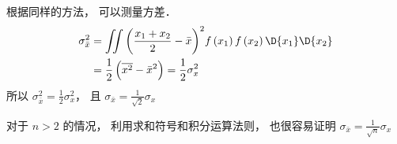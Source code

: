 根据同样的方法， 可以测量方差．
  \begin{equation}
  \begin{aligned}
\sigma_{\bar x}^2 &= \iint {{{\left( {\frac{{x_1} + {x_2}}{2} - \bar x} \right)}^2}f\left( {x_1} \right)f\left( {x_2} \right)\D {x_1}\D {x_2}} \\
&= \frac{1}{2}\left( {\overline {x^2}  - {{\bar x}^2}} \right) = \frac{1}{2}\sigma_x^2
\end{aligned} 
\end{equation}
所以 $\sigma_{\bar x}^2 = \frac{1}{2}\sigma_x^2$，  且  ${\sigma_{\bar x}} = \frac{1}{{\sqrt 2 }}{\sigma_x}$ 

对于 $n > 2$ 的情况， 利用求和符号和积分运算法则， 也很容易证明  ${\sigma_{\bar x}} = \frac{1}{{\sqrt n }}{\sigma_x}$ 
